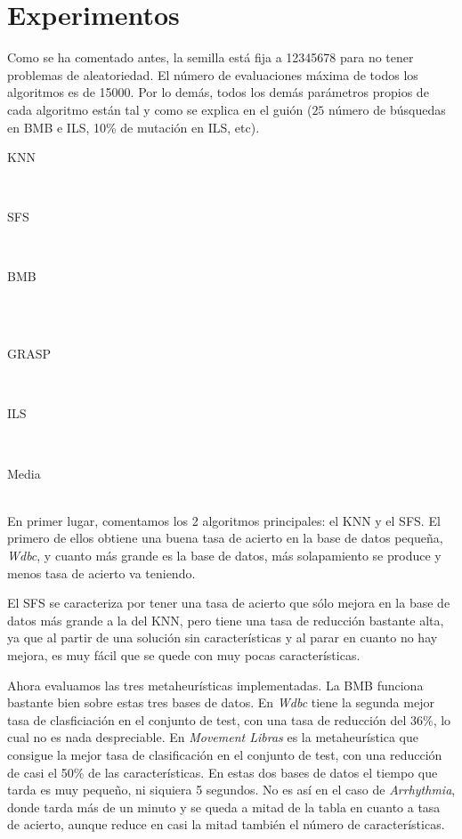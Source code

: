 \documentclass[a4paper, 11pt]{article}
\begin{document}
  \section{Experimentos}
    Como se ha comentado antes, la semilla está fija a 12345678 para no tener problemas de aleatoriedad. El número de evaluaciones máxima de todos los algoritmos es de 15000. Por lo demás, todos los demás parámetros propios de cada algoritmo están tal y como se explica en el guión ($25$ número de búsquedas en BMB e ILS, 10\% de mutación en ILS, etc). \\

    \newpage

    \centerline{KNN}
    \\
    \centerline{SFS}
    
    \\ \centerline{BMB}
    \\
    \\ \centerline{GRASP}
    
    \\ \centerline{ILS}
     \\
    \newpage
    \centerline{Media}
    \\

    En primer lugar, comentamos los 2 algoritmos principales: el KNN y el SFS. El primero de ellos obtiene una buena tasa de acierto en la base de datos pequeña, \emph{Wdbc}, y cuanto más grande es la base de datos, más solapamiento se produce y menos tasa de acierto va teniendo.

    El SFS se caracteriza por tener una tasa de acierto que sólo mejora en la base de datos más grande a la del KNN, pero tiene una tasa de reducción bastante alta, ya que al partir de una solución sin características y al parar en cuanto no hay mejora, es muy fácil que se quede con muy pocas características.

    Ahora evaluamos las tres metaheurísticas implementadas. La BMB funciona bastante bien sobre estas tres bases de datos. En \emph{Wdbc} tiene la segunda mejor tasa de clasficiación en el conjunto de test, con una tasa de reducción del 36\%, lo cual no es nada despreciable. En \emph{Movement Libras} es la metaheurística que consigue la mejor tasa de clasificación en el conjunto de test, con una reducción de casi el 50\% de las características. En estas dos bases de datos el tiempo que tarda es muy pequeño, ni siquiera 5 segundos. No es así en el caso de \emph{Arrhythmia}, donde tarda más de un minuto y se queda a mitad de la tabla en cuanto a tasa de acierto, aunque reduce en casi la mitad también el número de características.
\end{document}
